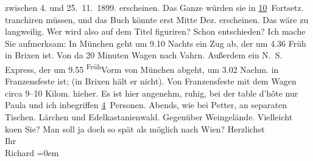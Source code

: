 \begin{ledgroupsized}[t]{13cm}
{{{                  zwischen 4. und 25. 11. 1899.}}}\label{K_L00973_1h} erscheinen. Das
               Ganze würden sie in \uline{10} Fortsetz. tranchiren müssen,
               und das Buch könnte erst Mitte Dez. erscheinen. Das wäre zu langweilig. Wer wird also
               auf dem Titel figuriren? Schon entschieden? Ich {\pb}mache Sie aufmerksam: In München geht um 9.10 Nachts ein Zug
               ab, der um 4.36 Früh in Brixen ist. Von da 20
               Minuten Wagen nach Vahrn. Außerdem ein N. S. Express, der um
                  9.55{ }\substVorne{}\textsuperscript{Früh}\substDazwischen{}Vorm\substHinten{} von München abgeht, um 3.02
                  Nachm. in Franzensfeste ist;  (in Brixen hält
               er nicht). Von Franzensfeste mit dem Wagen circa
               9–10 Kilom. hieher. Es ist hier angenehm, ruhig, bei der table d’hôte nur Paula und ich inbegriffen \uline{4} Personen. Abends, wie bei Petter, an
               separaten Tischen. Lärchen und Edelkastanienwald. Gegenüber Weingelände. Vielleicht
                  ko{\geminationm}en Sie? Man soll ja doch so spät als möglich nach
                  Wien?\pend
           \pstart
           Herzlichst{\\[\baselineskip]}Ihr{\\[\baselineskip]}\spacefill\mbox{Richard}\pend
           \leftskip=0em{}\endnumbering{}\end{ledgroupsized}  \newcommand{\dateiname}{L00973}\newcommand{\titel}{Richard Beer-Hofmann an Arthur Schnitzler, 12. 9. 1899}\newcommand{\editorInnen}{Martin Anton Müller und Gerd-Hermann Susen}
      